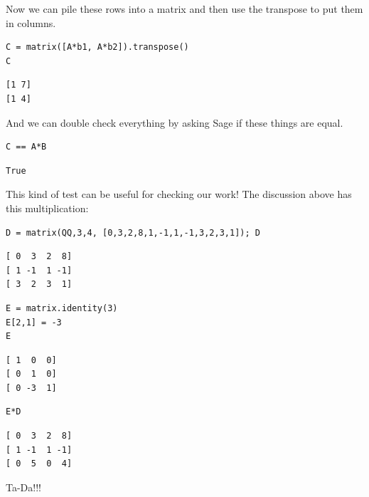 \documentclass[10pt,]{book}
\theoremstyle{plain}
\numberwithin{equation}{section}
\begin{document}
      Now we can pile these rows into a matrix and then use the transpose to
      put them in columns.
\begin{lstlisting}[style=sageinput]
C = matrix([A*b1, A*b2]).transpose()
C
\end{lstlisting}
\begin{lstlisting}[style=sageoutput]
[1 7]
[1 4]
\end{lstlisting}
\par

      And we can double check everything by asking Sage if these things are equal.
\begin{lstlisting}[style=sageinput]
C == A*B
\end{lstlisting}
\begin{lstlisting}[style=sageoutput]
True
\end{lstlisting}
\par

      This kind of test can be useful for checking our work! The discussion above
      has this multiplication:
\begin{lstlisting}[style=sageinput]
D = matrix(QQ,3,4, [0,3,2,8,1,-1,1,-1,3,2,3,1]); D
\end{lstlisting}
\begin{lstlisting}[style=sageoutput]
[ 0  3  2  8]
[ 1 -1  1 -1]
[ 3  2  3  1]
\end{lstlisting}
\begin{lstlisting}[style=sageinput]
E = matrix.identity(3)
E[2,1] = -3
E
\end{lstlisting}
\begin{lstlisting}[style=sageoutput]
[ 1  0  0]
[ 0  1  0]
[ 0 -3  1]
\end{lstlisting}
\begin{lstlisting}[style=sageinput]
E*D
\end{lstlisting}
\begin{lstlisting}[style=sageoutput]
[ 0  3  2  8]
[ 1 -1  1 -1]
[ 0  5  0  4]
\end{lstlisting}
\par

      Ta-Da!!!
\typeout{************************************************}
\typeout{************************************************}
\end{document}
